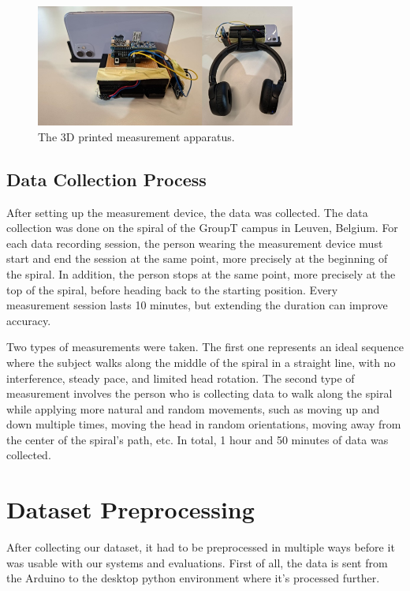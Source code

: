 \begin{figure}[h] 
	\centering \includegraphics[height=4cm]{./images/apparatus.png}
	\caption{The 3D printed measurement apparatus.}
	\label{measurementapparatus}
\end{figure}

\subsection{Data Collection Process}
After setting up the measurement device, the data was collected. The data collection was done on the spiral of the GroupT campus in Leuven, Belgium. For each data recording session, the person wearing the measurement device must start and end the session at the same point, more precisely at the beginning of the spiral. In addition, the person stops at the same point, more precisely at the top of the spiral, before heading back to the starting position. Every measurement session lasts 10 minutes, but extending the duration can improve accuracy.
\par
Two types of measurements were taken. The first one represents an ideal sequence where the subject walks along the middle of the spiral in a straight line, with no interference, steady pace, and limited head rotation. The second type of measurement involves the person who is collecting data to walk along the spiral while applying more natural and random movements, such as moving up and down multiple times, moving the head in random orientations, moving away from the center of the spiral's path, etc. In total, 1 hour and 50 minutes of data was collected.

\section{Dataset Preprocessing}
After collecting our dataset, it had to be preprocessed in multiple ways before it was usable with our systems and evaluations. First of all, the data is sent from the Arduino to the desktop python environment where it's processed further.

